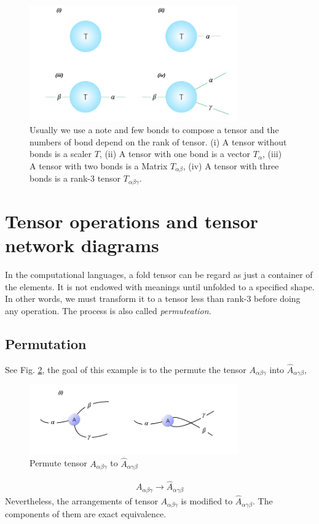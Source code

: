\begin{figure}[ht]
	\centering
	\includegraphics[width=0.80\textwidth]{figures/fig211.png}
	\caption[The reprecentation of commen tensors.]{Usually we use a note and few bonds to compose a tensor and the numbers of bond depend on the rank of tensor. (i) A tensor without bonds is a scaler $T$, (ii) A tensor with one bond is a vector $T_{\alpha}$, (iii) A tensor with two bonds is a Matrix $T_{\alpha \beta}$, (iv) A tensor with three bonds is a rank-3 tensor $T_{\alpha \beta \gamma}$.}
	\label{fig211}
\end{figure}

\section{Tensor operations and tensor network diagrams} %
\label{operation}
In the computational languages, a fold tensor can be regard as just a container of the elements. It is not endowed with meanings until unfolded to a specified shape. In other words, we must transform it to a tensor less than rank-3 before doing any operation. The process is also called \textit{permuteation}.

\subsection{Permutation}
See Fig. \ref{fig224}, the goal of this example is to the permute the tensor $A_{\alpha \beta \gamma}$ into $\hat{A}_{\alpha \gamma \beta}$,
\begin{figure}[ht]
	\centering
	\includegraphics[width=0.80\textwidth]{figures/fig224.png}
	\caption[The permutation of a tensor.]{ Permute tensor $A_{\alpha \beta \gamma}$ to $\hat{A}_{\alpha \gamma \beta}$ }
	\label{fig224}
\end{figure}
\begin{align}
	A_{\alpha \beta \gamma} \rightarrow \hat{A}_{\alpha \gamma \beta}
\end{align}
Nevertheless, the arrangements of tensor $A_{\alpha \beta \gamma}$ is modified to $\hat{A}_{\alpha \gamma \beta}$. The components of them are exact equivalence. 

